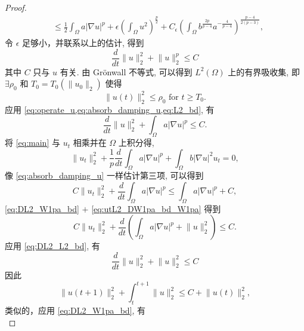 \documentclass[twoside,longtitle]{LZUthesis}
\theoremstyle{definition}
\numberwithin{equation}{chapter}
\newcommand*\abs[1]{\lvert#1\rvert}
\newcommand*\norm[1]{\lVert#1\rVert}
\begin{document}
\begin{proof}
\begin{equation}
\begin{split}
			&\leq \frac{1}{2}\int_{\Omega}a\abs{\nabla u}^p
			+ \epsilon \left(\int_{\Omega}u^2\right)^{\frac{p}{2}}
			+ C_{\epsilon}\left(\int_{\Omega}b^{\frac{2p}{p-4}}a^{-\frac{4}{p-4}}\right)^{\frac{p-4}{2(p-3)}},
		\end{split}
	\end{equation}
	令 $\epsilon$ 足够小，并联系以上的估计, 得到
	\begin{equation}\label{eq:DL2_L2_bd}
		\frac{d}{dt}\norm{u}_2^2 + \norm{u}_2^p \leq C
	\end{equation}
	其中 $C$ 只与 $u$ 有关. 由 Gr\"onwall 不等式, 可以得到 $L^2(\Omega)$ 上的有界吸收集,
	即 $\exists \rho_0$ 和
	$T_0 = T_0(\norm{u_0}_2)$ 使得
	\begin{equation}\label{eq:L2_bd}
		\norm{u(t)}_2^2 \leq \rho_0 \text{ for } t \geq T_0.
	\end{equation}
	应用 \cref{eq:operate_u,eq:absorb_damping_u,eq:L2_bd}, 有
	\begin{equation}\label{eq:DL2_W1pa_bd}
		\frac{d}{dt}\norm{u}_2^2 + \int_{\Omega}a \abs{\nabla u}^p \leq C.
	\end{equation}
	将 \cref{eq:main} 与 $u_{t}$ 相乘并在 $\Omega$ 上积分得,
	\begin{equation}\label{eq:operate_ut}
		\norm{u_t}_2^2
		+ \frac{1}{p}\frac{d}{dt}\int_{\Omega}a \abs{\nabla u}^p
		+ \int_{\Omega}b \abs{\nabla u}^2 u_t
		= 0,
	\end{equation}
	像 \cref{eq:absorb_damping_u} 一样估计第三项, 可以得到
	\begin{equation}\label{eq:utL2_DW1pa_bd_W1pa}
		C\norm{u_t}_2^2
		+ \frac{d}{dt}\int_{\Omega}a \abs{\nabla u}^p
		\leq \int_{\Omega}a \abs{\nabla u}^p
		+ C,
	\end{equation}
	\cref{eq:DL2_W1pa_bd} $+$ \cref{eq:utL2_DW1pa_bd_W1pa} 得到
	\begin{equation}\label{eq:utL2_DW1pa_DL2}
		C\norm{u_t}_2^2
		+ \frac{d}{dt}\left(\int_{\Omega}a \abs{\nabla u}^p
		+ \norm{u}_2^2\right)
		\leq C.
	\end{equation}
	应用 \cref{eq:DL2_L2_bd}, 有
	\begin{equation}
		\frac{d}{dt}\norm{u}_2^2 + \norm{u}_2^2 \leq C
	\end{equation}
	因此
	\begin{equation}\label{eq:int_DL2_L2_bd}
		\norm{u(t+1)}_2^2
		+ \int_t^{t+1}\norm{u}_2^2
		\leq C + \norm{u(t)}_2^2,
	\end{equation}
	类似的，应用 \cref{eq:DL2_W1pa_bd}, 有
	\begin{equation}\label{eq:int_DL2_W1pa_bd}

\end{equation}
\end{proof}
\end{document}

